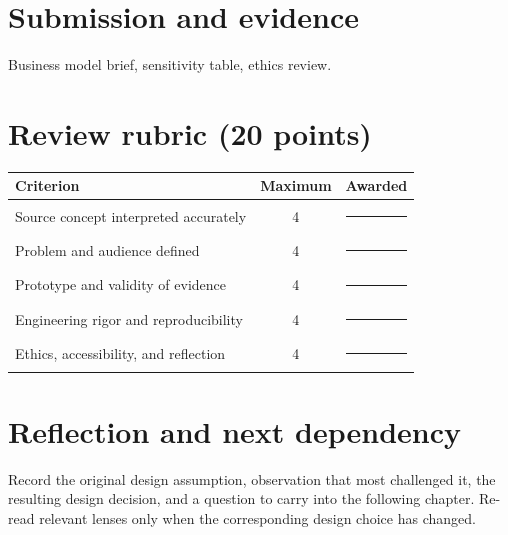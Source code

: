 \documentclass[11pt]{article}
\begin{document}
\section{Submission and evidence}
Business model brief, sensitivity table, ethics review.


\section{Review rubric (20 points)}
\begin{tabularx}{\linewidth}{@{}Xcc@{}}\toprule
Criterion & Maximum & Awarded \\ \midrule
Source concept interpreted accurately & 4 & \rule{0.45in}{0.4pt}\\
Problem and audience defined & 4 & \rule{0.45in}{0.4pt}\\
Prototype and validity of evidence & 4 & \rule{0.45in}{0.4pt}\\
Engineering rigor and reproducibility & 4 & \rule{0.45in}{0.4pt}\\
Ethics, accessibility, and reflection & 4 & \rule{0.45in}{0.4pt}\\\bottomrule
\end{tabularx}

\section{Reflection and next dependency}
Record the original design assumption, observation that most challenged it, the resulting design decision, and a question to carry into the following chapter. Re-read relevant lenses only when the corresponding design choice has changed.
\end{document}
